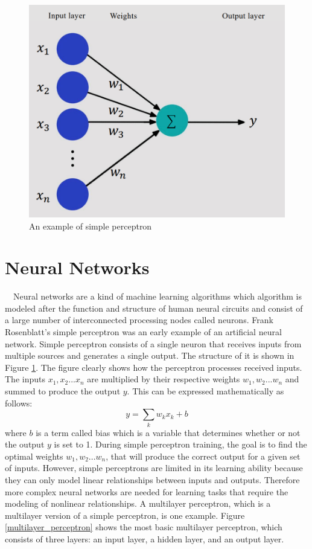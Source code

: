 \begin{figure}[h]
  \centering
  \includegraphics[width=130truemm]{resources/2_background/simple_perceptron.png}
  \caption{
    An example of simple perceptron
  }
  \label{simple_perceptron}
\end{figure}

\section{Neural Networks}
　Neural networks are a kind of machine learning algorithms which 
algorithm is modeled after the function and structure of human 
neural circuits and consist of a large number of interconnected 
processing nodes called neurons.
Frank Rosenblatt's simple perceptron \cite{Rosenblatt1958ThePA} was 
an early example of an artificial neural network. 
Simple perceptron consists of a single neuron that receives inputs 
from multiple sources and generates a single output. 
The structure of it is shown in Figure \ref{simple_perceptron}. 
The figure clearly shows how the perceptron processes received inputs.
The inputs $x_1, x_2 ... x_n$ are multiplied by their respective weights
$w_1, w_2 ... w_n$ and summed to produce the output $y$.
This can be expressed mathematically as follows:
\begin{equation}
  \label{perceptron_output}
  y = \sum_{k}w_k x_k + b
\end{equation}
where $b$ is a term called bias which is a variable that determines 
whether or not the output $y$ is set to 1.
During simple perceptron training, the goal is to find the optimal 
weights $w_1, w_2 ... w_n$, that will produce the correct output for 
a given set of inputs.
However, simple perceptrons are limited in its learning ability because 
they can only model linear relationships between inputs and outputs.
Therefore more complex neural networks are needed for learning tasks 
that require the modeling of nonlinear relationships.
A multilayer perceptron, which is a multilayer version of a simple 
perceptron, is one example. Figure \ref{multilayer_perceptron} shows
the most basic multilayer perceptron, which consists of three layers: 
an input layer, a hidden layer, and an output layer.

